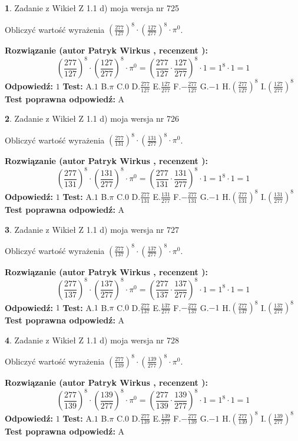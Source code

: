 \documentclass[12pt, a4paper]{article}
\theoremstyle{definition} %
\newtheorem{zad}{}
\newcommand{\zadStart}[1]{\begin{zad}#1\newline}
\newcommand{\zadStop}{\end{zad}}
\newcommand{\rozwStart}[2]{\noindent \textbf{Rozwiązanie (autor #1 , recenzent #2): }\newline}
\newcommand{\rozwStop}{\newline}
\newcommand{\odpStart}{\noindent \textbf{Odpowiedź:}\newline}
\newcommand{\odpStop}{\newline}
\newcommand{\testStart}{\noindent \textbf{Test:}\newline}
\newcommand{\testStop}{\newline}
\newcommand{\kluczStart}{\noindent \textbf{Test poprawna odpowiedź:}\newline}
\newcommand{\kluczStop}{\newline}
\begin{document}
\zadStart{Zadanie z Wikieł Z 1.1 d) moja wersja nr 725}

Obliczyć wartość wyrażenia $(\frac{277}{127})^{8} \cdot (\frac{127}{277})^{8} \cdot \pi^{0}$.
\zadStop
\rozwStart{Patryk Wirkus}{}
$$(\frac{277}{127})^{8} \cdot (\frac{127}{277})^{8} \cdot \pi^{0} = (\frac{277}{127} \cdot \frac{127}{277})^{8} \cdot 1 = 1^{8} \cdot 1 = 1$$
\rozwStop
\odpStart
$1$
\odpStop
\testStart
A.$1$ B.$\pi$ C.$0$ D.$\frac{277}{127}$ E.$\frac{127}{277}$
F.$-\frac{277}{127}$ G.$-1$
H.$(\frac{277}{127})^{8}$
I.$(\frac{127}{277})^{8}$
\testStop
\kluczStart
A
\kluczStop



\zadStart{Zadanie z Wikieł Z 1.1 d) moja wersja nr 726}

Obliczyć wartość wyrażenia $(\frac{277}{131})^{8} \cdot (\frac{131}{277})^{8} \cdot \pi^{0}$.
\zadStop
\rozwStart{Patryk Wirkus}{}
$$(\frac{277}{131})^{8} \cdot (\frac{131}{277})^{8} \cdot \pi^{0} = (\frac{277}{131} \cdot \frac{131}{277})^{8} \cdot 1 = 1^{8} \cdot 1 = 1$$
\rozwStop
\odpStart
$1$
\odpStop
\testStart
A.$1$ B.$\pi$ C.$0$ D.$\frac{277}{131}$ E.$\frac{131}{277}$
F.$-\frac{277}{131}$ G.$-1$
H.$(\frac{277}{131})^{8}$
I.$(\frac{131}{277})^{8}$
\testStop
\kluczStart
A
\kluczStop



\zadStart{Zadanie z Wikieł Z 1.1 d) moja wersja nr 727}

Obliczyć wartość wyrażenia $(\frac{277}{137})^{8} \cdot (\frac{137}{277})^{8} \cdot \pi^{0}$.
\zadStop
\rozwStart{Patryk Wirkus}{}
$$(\frac{277}{137})^{8} \cdot (\frac{137}{277})^{8} \cdot \pi^{0} = (\frac{277}{137} \cdot \frac{137}{277})^{8} \cdot 1 = 1^{8} \cdot 1 = 1$$
\rozwStop
\odpStart
$1$
\odpStop
\testStart
A.$1$ B.$\pi$ C.$0$ D.$\frac{277}{137}$ E.$\frac{137}{277}$
F.$-\frac{277}{137}$ G.$-1$
H.$(\frac{277}{137})^{8}$
I.$(\frac{137}{277})^{8}$
\testStop
\kluczStart
A
\kluczStop



\zadStart{Zadanie z Wikieł Z 1.1 d) moja wersja nr 728}

Obliczyć wartość wyrażenia $(\frac{277}{139})^{8} \cdot (\frac{139}{277})^{8} \cdot \pi^{0}$.
\zadStop
\rozwStart{Patryk Wirkus}{}
$$(\frac{277}{139})^{8} \cdot (\frac{139}{277})^{8} \cdot \pi^{0} = (\frac{277}{139} \cdot \frac{139}{277})^{8} \cdot 1 = 1^{8} \cdot 1 = 1$$
\rozwStop
\odpStart
$1$
\odpStop
\testStart
A.$1$ B.$\pi$ C.$0$ D.$\frac{277}{139}$ E.$\frac{139}{277}$
F.$-\frac{277}{139}$ G.$-1$
H.$(\frac{277}{139})^{8}$
I.$(\frac{139}{277})^{8}$
\testStop
\kluczStart
A
\kluczStop
\end{document}
